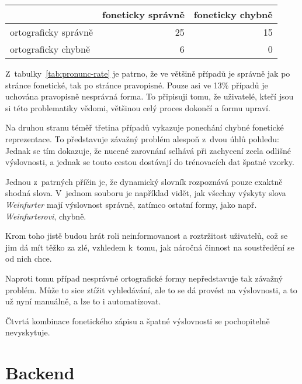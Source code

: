 \begin{table*}[htpb]
\begin{center}
\begin{tabular}{|l|r|r|}
\hline
 & foneticky správně & foneticky chybně \\
\hline
ortograficky správně & 25 & 15 \\
\hline
ortograficky chybně & 6 & 0 \\
\hline
\end{tabular}
\caption{Správnost fonetické a ortografické reprezentece cizích slov na základě
tabulky~\ref{tab:eval-pronunc}}
\label{tab:pronunc-rate}
\end{center}
\end{table*}

Z~tabulky~\ref{tab:pronunc-rate} je patrno, že ve většině případů je správně jak
po stránce fonetické, tak po stránce pravopisné. Pouze asi ve 13\% případů je
uchována pravopisně nesprávná forma. To připisuji tomu, že uživatelé, kteří jsou
si této problematiky vědomi, většinou celý proces dokončí a formu upraví.

Na druhou stranu téměř třetina případů vykazuje ponechání chybné fonetické
reprezentace. To představuje závažný problém alespoň z~dvou úhlů pohledu: Jednak
se tím dokazuje, že nucené zarovnání selhává při zachycení zcela odlišné
výslovnosti, a jednak se touto cestou dostávají do trénovacích dat špatné
vzorky.

Jednou z~patrných příčin je, že dynamický slovník rozpoznává pouze exaktně
shodná slova. V~jednom souboru je například vidět, jak všechny výskyty slova
{\em Weinfurter} mají výslovnost správně, zatímco ostatní formy, jako např. {\em
Weinfurterovi}, chybně.

Krom toho jistě budou hrát roli neinformovanost a roztržitost uživatelů, což se
jim dá mít těžko za zlé, vzhledem k~tomu, jak náročná činnost na soustředění se
od nich chce.

Naproti tomu případ nesprávné ortografické formy nepředstavuje tak závažný
problém. Může to sice ztížit vyhledávání, ale to se dá provést na výslovnosti, a
to už nyní manuálně, a lze to i automatizovat.

Čtvrtá kombinace fonetického zápisu a špatné výslovnosti se pochopitelně
nevyskytuje.

\normalfont 

\section{Backend}

